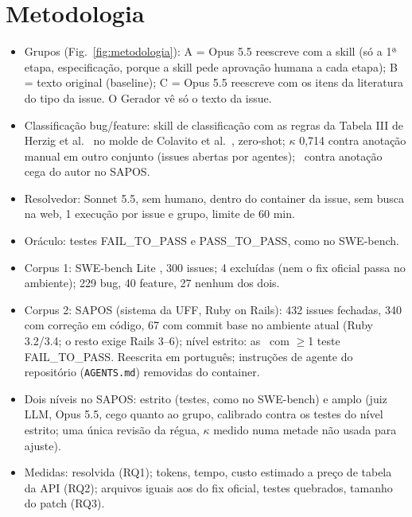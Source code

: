 \documentclass[sigconf]{acmart}
\newcommand{\topicos}[1]{{\color{gray}\begin{itemize}\setlength\itemsep{0pt}#1\end{itemize}}}
\begin{document}
\section{Metodologia}

\topicos{
\item Grupos (Fig.~\ref{fig:metodologia}): A = Opus 5.5 reescreve com a skill (só a 1ª etapa, especificação, porque a skill pede aprovação humana a cada etapa); B = texto original (baseline); C = Opus 5.5 reescreve com os itens da literatura do tipo da issue. O Gerador vê só o texto da issue.
\item Classificação bug/feature: skill de classificação com as regras da Tabela III de Herzig et al.~\cite{herzig2013} no molde de Colavito et al.~\cite{colavito2024}, zero-shot; $\kappa$ 0,714 contra anotação manual em outro conjunto (issues abertas por agentes); \SaposKappa\ contra anotação cega do autor no SAPOS.
\item Resolvedor: Sonnet 5.5, sem humano, dentro do container da issue, sem busca na web, 1 execução por issue e grupo, limite de 60 min.
\item Oráculo: testes FAIL\_TO\_PASS e PASS\_TO\_PASS, como no SWE-bench.
\item Corpus 1: SWE-bench Lite \cite{jimenez2024swebench}, 300 issues; 4 excluídas (nem o fix oficial passa no ambiente); 229 bug, 40 feature, 27 nenhum dos dois.
\item Corpus 2: SAPOS (sistema da UFF, Ruby on Rails): 432 issues fechadas, 340 com correção em código, 67 com commit base no ambiente atual (Ruby 3.2/3.4; o resto exige Rails 3--6); nível estrito: as \SaposN\ com $\geq$1 teste FAIL\_TO\_PASS. Reescrita em português; instruções de agente do repositório (\texttt{AGENTS.md}) removidas do container.
\item Dois níveis no SAPOS: estrito (testes, como no SWE-bench) e amplo (juiz LLM, Opus 5.5, cego quanto ao grupo, calibrado contra os testes do nível estrito; uma única revisão da régua, $\kappa$ medido numa metade não usada para ajuste).
\item Medidas: resolvida (RQ1); tokens, tempo, custo estimado a preço de tabela da API (RQ2); arquivos iguais aos do fix oficial, testes quebrados, tamanho do patch (RQ3).
}
\end{document}

